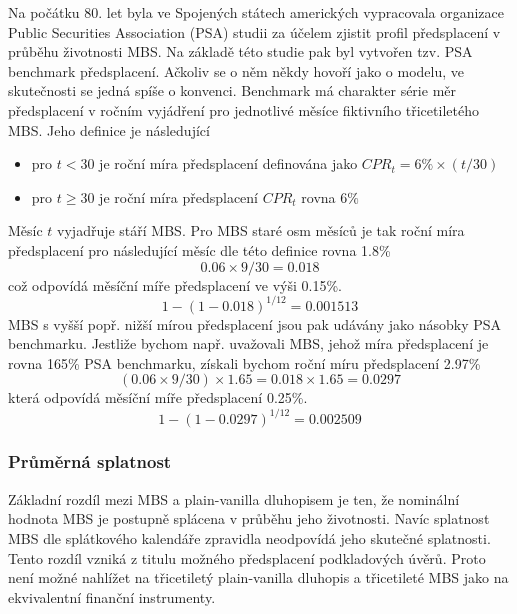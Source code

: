 \documentclass[a4paper]{book}
\begin{document}
Na počátku 80. let byla ve Spojených státech amerických vypracovala organizace Public Securities Association (PSA) studii za účelem zjistit profil předsplacení v průběhu životnosti MBS. Na základě této studie pak byl vytvořen tzv. PSA benchmark předsplacení. Ačkoliv se o něm někdy hovoří jako o modelu, ve skutečnosti se jedná spíše o konvenci. Benchmark má charakter série měr předsplacení v ročním vyjádření pro jednotlivé měsíce fiktivního třicetiletého MBS. Jeho definice je následující
\begin{itemize}
\item pro $t < 30$ je roční míra předsplacení definována jako $CPR_t = 6\% \times (t/30)$
\item pro $t \ge 30$ je roční míra předsplacení $CPR_t$ rovna $6\%$
\end{itemize}
Měsíc $t$ vyjadřuje stáří MBS. Pro MBS staré osm měsíců je tak roční míra předsplacení pro následující měsíc dle této definice rovna 1.8\%
\begin{equation*}
0.06 \times 9/30 = 0.018 
\end{equation*}
což odpovídá měsíční míře předsplacení ve výši 0.15\%.
\begin{equation*}
1 - (1 - 0.018)^{1/12} = 0.001513
\end{equation*}
MBS s vyšší popř. nižší mírou předsplacení jsou pak udávány jako násobky PSA benchmarku. Jestliže bychom např. uvažovali MBS, jehož míra předsplacení je rovna 165\% PSA benchmarku, získali bychom roční míru předsplacení 2.97\%
\begin{equation*}
(0.06 \times 9/30) \times 1.65 = 0.018 \times 1.65 =0.0297
\end{equation*}
která odpovídá měsíční míře předsplacení 0.25\%. 
\begin{equation*}
1 - (1 - 0.0297)^{1/12} = 0.002509
\end{equation*}

\subsubsection{Průměrná splatnost}

Základní rozdíl mezi MBS a plain-vanilla dluhopisem je ten, že nominální hodnota MBS je postupně splácena v průběhu jeho životnosti. Navíc splatnost MBS dle splátkového kalendáře zpravidla neodpovídá jeho skutečné splatnosti. Tento rozdíl vzniká z titulu možného předsplacení podkladových úvěrů. Proto není možné nahlížet na třicetiletý plain-vanilla dluhopis a třicetileté MBS jako na ekvivalentní finanční instrumenty.
\end{document}
